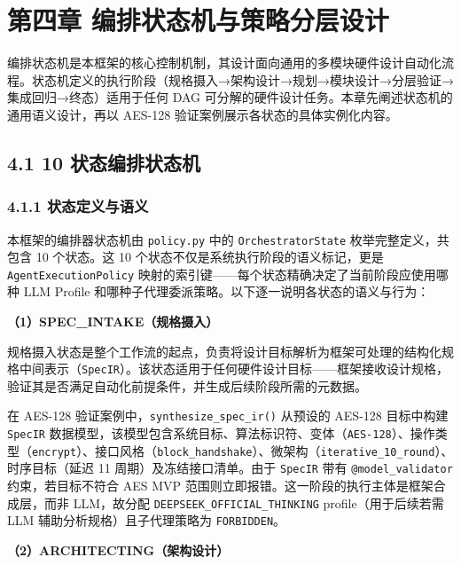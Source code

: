 \section{第四章
编排状态机与策略分层设计}\label{ux7b2cux56dbux7ae0-ux7f16ux6392ux72b6ux6001ux673aux4e0eux7b56ux7565ux5206ux5c42ux8bbeux8ba1}

编排状态机是本框架的核心控制机制，其设计面向通用的多模块硬件设计自动化流程。状态机定义的执行阶段（规格摄入→架构设计→规划→模块设计→分层验证→集成回归→终态）适用于任何
DAG 可分解的硬件设计任务。本章先阐述状态机的通用语义设计，再以 AES-128
验证案例展示各状态的具体实例化内容。

\subsection{4.1 10
状态编排状态机}\label{ux72b6ux6001ux7f16ux6392ux72b6ux6001ux673a}

\subsubsection{4.1.1
状态定义与语义}\label{ux72b6ux6001ux5b9aux4e49ux4e0eux8bedux4e49}

本框架的编排器状态机由 \texttt{policy.py} 中的
\texttt{OrchestratorState} 枚举完整定义，共包含 10 个状态。这 10
个状态不仅是系统执行阶段的语义标记，更是 \texttt{AgentExecutionPolicy}
映射的索引键------每个状态精确决定了当前阶段应使用哪种 LLM Profile
和哪种子代理委派策略。以下逐一说明各状态的语义与行为：

\textbf{（1）SPEC\_INTAKE（规格摄入）}

规格摄入状态是整个工作流的起点，负责将设计目标解析为框架可处理的结构化规格中间表示（\texttt{SpecIR}）。该状态适用于任何硬件设计目标------框架接收设计规格，验证其是否满足自动化前提条件，并生成后续阶段所需的元数据。

在 AES-128 验证案例中，\texttt{synthesize\_spec\_ir()} 从预设的 AES-128
目标中构建 \texttt{SpecIR}
数据模型，该模型包含系统目标、算法标识符、变体（\texttt{AES-128}）、操作类型（\texttt{encrypt}）、接口风格（\texttt{block\_handshake}）、微架构（\texttt{iterative\_10\_round}）、时序目标（延迟
11 周期）及冻结接口清单。由于 \texttt{SpecIR} 带有
\texttt{@model\_validator} 约束，若目标不符合 AES MVP
范围则立即报错。这一阶段的执行主体是框架合成层，而非 LLM，故分配
\texttt{DEEPSEEK\_OFFICIAL\_THINKING} profile（用于后续若需 LLM
辅助分析规格）且子代理策略为 \texttt{FORBIDDEN}。

\textbf{（2）ARCHITECTING（架构设计）}


